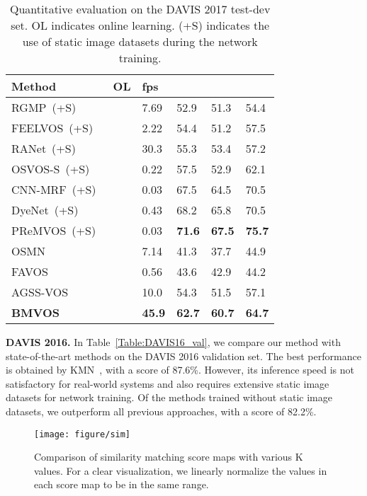 \documentclass[10pt,twocolumn,letterpaper]{article}
\begin{document}
	
	\begin{table}
		\centering 
		\caption{Quantitative evaluation on the DAVIS 2017 test-dev set. OL indicates online learning. (+S) indicates the use of static image datasets during the network training.}
		\vspace{2mm}
		\small
		\begin{tabular}{lP{0.58cm}P{0.58cm}P{0.58cm}P{0.58cm}P{0.58cm}}
			\toprule
			Method &OL &fps & & &\\
			\midrule
			RGMP~(+S)~\cite{RGMP} & &7.69 &52.9 &51.3 &54.4\\
			FEELVOS~(+S)~\cite{FEELVOS} & &2.22 &54.4 &51.2 &57.5\\
			RANet~(+S)~\cite{RANet} & &30.3 &55.3 &53.4 &57.2\\
			OSVOS-S~(+S)~\cite{OSVOS-S} &\checkmark &0.22 &57.5 &52.9 &62.1\\
			CNN-MRF~(+S)~\cite{CNN-MRF} &\checkmark &0.03 &67.5 &64.5 &70.5\\
			DyeNet~(+S)~\cite{DyeNet} &\checkmark &0.43 &68.2 &65.8 &70.5\\
			PReMVOS~(+S)~\cite{PReMVOS} &\checkmark &0.03 &\textbf{71.6} &\textbf{67.5} &\textbf{75.7}\\
			\midrule
			OSMN~\cite{OSMN} & &7.14 &41.3 &37.7 &44.9\\
			FAVOS~\cite{FAVOS} & &0.56 &43.6 &42.9 &44.2\\
			AGSS-VOS~\cite{AGSS-VOS} & &10.0 &54.3 &51.5 &57.1\\
			\midrule
			\textbf{BMVOS} & &\textbf{45.9} &\textbf{62.7} &\textbf{60.7} &\textbf{64.7}\\
			\bottomrule
		\end{tabular}
		\label{Table:DAVIS17_test}
	\end{table}
	

	\noindent\textbf{DAVIS 2016.} In Table~\ref{Table:DAVIS16_val}, we compare our method with state-of-the-art methods on the DAVIS 2016 validation set. The best performance is obtained by KMN~\cite{KMN}, with a  score of 87.6\%. However, its inference speed is not satisfactory for real-world systems and also requires extensive static image datasets for network training. Of the methods trained without static image datasets, we outperform all previous approaches, with a  score of 82.2\%.
	
	
	\begin{figure*}[t]
		\centering
		\texttt{[image: figure/sim]}
		\caption{Comparison of similarity matching score maps with various K values. For a clear visualization, we linearly normalize the values in each score map to be in the same range.}
		\label{figure5}
	\end{figure*}
	
\end{document}
